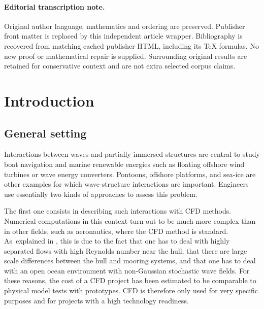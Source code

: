 \documentclass[11pt]{article}
\theoremstyle{definition}
\begin{document}
\paragraph{Editorial transcription note.}
Original author language, mathematics and ordering are preserved. Publisher front matter is replaced by this independent article wrapper. Bibliography is recovered from matching cached publisher HTML, including its TeX formulas. No new proof or mathematical repair is supplied. Surrounding original results are retained for conservative context and are not extra selected corpus claims.
\clearpage

\section{Introduction}
\subsection{General setting}
Interactions between waves and partially immersed structures are central to study boat navigation and marine renewable energies
such as floating offshore wind turbines or wave energy converters.
Pontoons, offshore platforms, and sea-ice are other examples for which wave-structure interactions are important.
Engineers use essentially two kinds of approaches to assess this problem.

The first one consists in describing such interactions with CFD methods.
Numerical computations in this context turn out to be much more complex than in other fields, such as aeronautics, where the CFD method is standard. As~explained in \cite{Kim}, this is due to the fact that one has to deal with highly separated flows with high Reynolds number near the hull,
that there are large scale differences between the hull and mooring systems,
and that one has to deal with an open ocean environment with non-Gaussian stochastic wave fields.
For these reasons, the cost of a CFD project has been estimated to be comparable to physical model tests with prototypes.
CFD is therefore only used for very specific purposes and for projects with a high technology readiness.
\end{document}
